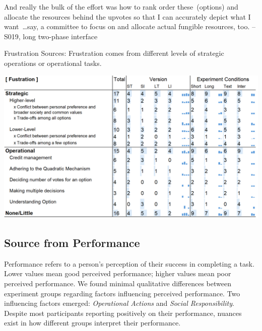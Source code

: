 \begin{displayquote}
And really the bulk of the effort was how to rank order these~(options) and allocate the resources behind the upvotes so that I can accurately depict what I want~\ldots say, a committee to focus on and allocate actual fungible resources, too. \noindent \hfill -- S019, long two-phase interface
\end{displayquote}




\begin{table}[p]
    \caption{Frustration Sources: Frustration comes from different levels of strategic operations or operational tasks.}

    \label{tbl:fustration}
    \includegraphics[width=0.7\linewidth]{content/image/cog/fustration_table.png}
\end{table}

\subsection{Source from Performance}
\label{apdx:performance}

Performance refers to a person's perception of their success in completing a task. Lower values mean good perceived performance; higher values mean poor perceived performance. We found minimal qualitative differences between experiment groups regarding factors influencing perceived performance. Two influencing factors emerged: \textit{Operational Actions} and \textit{Social Responsibility}. Despite most participants reporting positively on their performance, nuances exist in how different groups interpret their performance.

